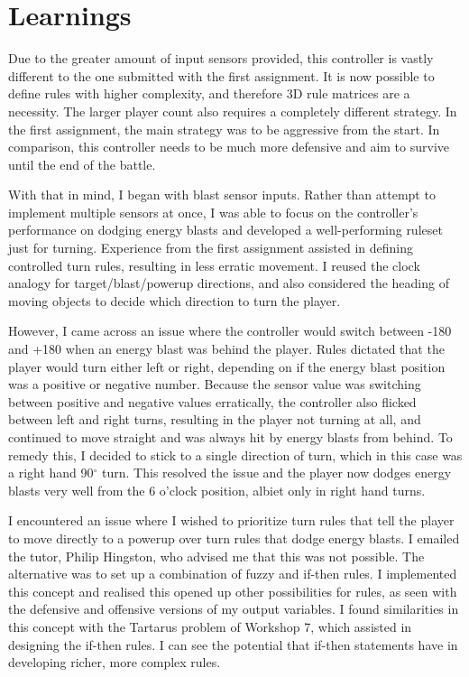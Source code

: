 \section{Learnings}

Due to the greater amount of input sensors provided, this controller is vastly different to the one submitted with the first assignment. It is now possible to define rules with higher complexity, and therefore 3D rule matrices are a necessity. The larger player count also requires a completely different strategy. In the first assignment, the main strategy was to be aggressive from the start. In comparison, this controller needs to be much more defensive and aim to survive until the end of the battle.

With that in mind, I began with blast sensor inputs. Rather than attempt to implement multiple sensors at once, I was able to focus on the controller's performance on dodging energy blasts and developed a well-performing ruleset just for turning. Experience from the first assignment assisted in defining controlled turn rules, resulting in less erratic movement. I reused the clock analogy for target/blast/powerup directions, and also considered the heading of moving objects to decide which direction to turn the player. 

However, I came across an issue where the controller would switch between -180 and +180 when an energy blast was behind the player. Rules dictated that the player would turn either left or right, depending on if the energy blast position was a positive or negative number. Because the sensor value was switching between positive and negative values erratically, the controller also flicked between left and right turns, resulting in the player not turning at all, and continued to move straight and was always hit by energy blasts from behind. To remedy this, I decided to stick to a single direction of turn, which in this case was a right hand 90$^{\circ}$ turn. This resolved the issue and the player now dodges energy blasts very well from the 6 o'clock position, albiet only in right hand turns.

I encountered an issue where I wished to prioritize turn rules that tell the player to move directly to a powerup over turn rules that dodge energy blasts. I emailed the tutor, Philip Hingston, who advised me that this was not possible. The alternative was to set up a combination of fuzzy and if-then rules. I implemented this concept and realised this opened up other possibilities for rules, as seen with the defensive and offensive versions of my output variables. I found similarities in this concept with the Tartarus problem of Workshop 7, which assisted in designing the if-then rules. I can see the potential that if-then statements have in developing richer, more complex rules.

